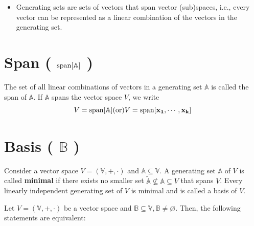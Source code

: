 \begin{itemize}
    \item Generating sets are sets of vectors that span vector (sub)spaces, i.e., every vector can be represented as a linear combination of the vectors in the generating set.
\end{itemize}













\section{Span ( $\operatorname{span}[\mathbb{A}]$ ) \cite{mfml-1}} \label{lin-alg: Span}
The set of all linear combinations of vectors in a generating set $\mathbb{A}$ is called the span of $\mathbb{A}$. If $\mathbb{A}$ spans the vector space $V$, we write 
\[
    \hfill
    V = \rcmdXspan[\mathbb{A}]
    \hfill
    \text{(or)}
    \hfill
    V = \rcmdXspan[\mathbf{x_1, \cdots , x_k}]
    \hfill
\]













\section{Basis ( $\mathbb{B}$ ) \cite{mfml-1}}\label{lin-alg: Basis}
Consider a vector space $V = (\mathbb{V}, +, \cdot)$ and $\mathbb{A} \subseteq \mathbb{V}$. A generating set $\mathbb{A}$ of $V$ is called \textbf{minimal} if there exists no smaller set $\tilde{\mathbb{A}} \not\subseteq \mathbb{A} \subseteq V$ that spans $V$. Every linearly independent generating set of $V$ is minimal and is called a basis of $V$.

\vspace{0.2cm}
Let $V = (\mathbb{V}, +, \cdot)$ be a vector space and $\mathbb{B} \subseteq \mathbb{V}, \mathbb{B} \neq \varnothing$. Then, the following statements are equivalent:

